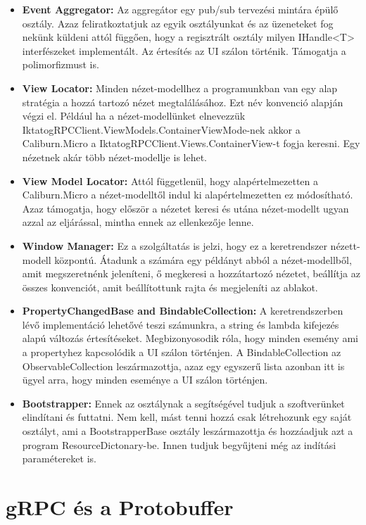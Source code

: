 \documentclass[
]{thesis-ekf}
\theoremstyle{definition}
\theoremstyle{remark}
\begin{document}
\begin{itemize}[leftmargin=*]
\item \textbf{Event Aggregator:  }Az aggregátor egy pub/sub tervezési mintára épülő osztály. Azaz feliratkoztatjuk az egyik osztályunkat és az üzeneteket fog nekünk küldeni attól függően, hogy a regisztrált osztály milyen IHandle<T> interfészeket implementált. Az értesítés az UI szálon történik. Támogatja a polimorfizmust is. 
\item \textbf{View Locator:  }Minden nézet-modellhez a programunkban van egy alap stratégia a hozzá tartozó nézet megtalálásához. Ezt név konvenció alapján végzi el. Például ha a nézet-modellünket elnevezzük IktatogRPCClient.ViewModels.ContainerViewMode-nek akkor a Caliburn.Micro a IktatogRPCClient.Views.ContainerView-t fogja keresni. Egy nézetnek akár több nézet-modellje is lehet. \cite{caliburn}
\item \textbf{View Model Locator: }	Attól függetlenül, hogy alapértelmezetten a Caliburn.Micro a nézet-modelltől indul ki alapértelmezetten ez módosítható. Azaz támogatja, hogy először a nézetet keresi és utána nézet-modellt ugyan azzal az eljárással, mintha ennek az ellenkezője lenne. \cite{caliburn}
\item \textbf{Window Manager: }Ez a szolgáltatás is jelzi, hogy ez a keretrendszer nézett-modell központú. Átadunk a számára egy példányt abból a nézet-modellből, amit megszeretnénk jeleníteni, ő megkeresi a hozzátartozó nézetet, beállítja az összes konvenciót, amit beállítottunk rajta és megjeleníti az ablakot. \cite{caliburn}
\item \textbf{PropertyChangedBase and BindableCollection: }	A keretrendszerben lévő implementáció lehetővé teszi számunkra, a string és lambda kifejezés alapú változás értesítéseket. Megbizonyosodik róla, hogy minden esemény ami a propertyhez kapcsolódik a UI szálon történjen. A BindableCollection az ObservableCollection leszármazottja, azaz egy egyszerű lista azonban itt is ügyel arra, hogy minden eseménye a UI szálon történjen.\cite{caliburn}
\item \textbf{Bootstrapper: }Ennek az osztálynak a segítségével tudjuk a szoftverünket elindítani és futtatni. Nem kell, mást tenni hozzá csak létrehozunk egy saját osztályt, ami a BootstrapperBase osztály leszármazottja és hozzáadjuk azt a program ResourceDictonary-be. Innen tudjuk begyűjteni még az indítási paramétereket is.\cite{caliburn}
\end{itemize}
\section{gRPC és a Protobuffer}
\end{document}
